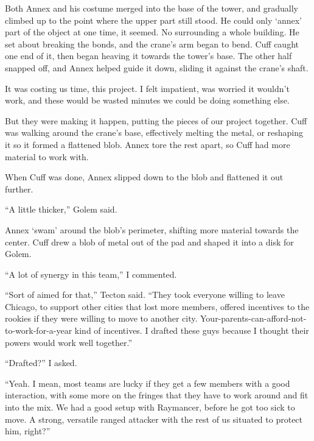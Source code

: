 Both Annex and his costume merged into the base of the tower, and gradually climbed up to the point where the upper part still stood.  He could only `annex' part of the object at one time, it seemed.  No surrounding a whole building.  He set about breaking the bonds, and the crane's arm began to bend.  Cuff caught one end of it, then began heaving it towards the tower's base.  The other half snapped off, and Annex helped guide it down, sliding it against the crane's shaft.



It was costing us time, this project.  I felt impatient, was worried it wouldn't work, and these would be wasted minutes we could be doing something else.



But they were making it happen, putting the pieces of our project together.  Cuff was walking around the crane's base, effectively melting the metal, or reshaping it so it formed a flattened blob.  Annex tore the rest apart, so Cuff had more material to work with.



When Cuff was done, Annex slipped down to the blob and flattened it out further.



``A little thicker,'' Golem said.



Annex `swam' around the blob's perimeter, shifting more material towards the center.  Cuff drew a blob of metal out of the pad and shaped it into a disk for Golem.



``A lot of synergy in this team,'' I commented.



``Sort of aimed for that,'' Tecton said.  ``They took everyone willing to leave Chicago, to support other cities that lost more members, offered incentives to the rookies if they were willing to move to another city.  Your-parents-can-afford-not-to-work-for-a-year kind of incentives.  I drafted these guys because I thought their powers would work well together.''



``Drafted?'' I asked.



``Yeah.  I mean, most teams are lucky if they get a few members with a good interaction, with some more on the fringes that they have to work around and fit into the mix.  We had a good setup with Raymancer, before he got too sick to move.  A strong, versatile ranged attacker with the rest of us situated to protect him, right?''



